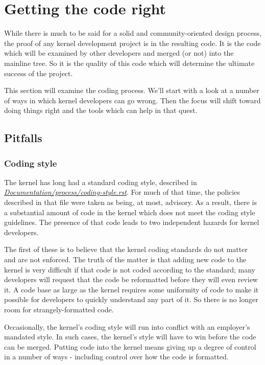 \documentclass[a4paper,8pt,english]{sphinxmanual}
\begin{document}
\section{Getting the code right}
\label{process/4.Coding:development-coding}\label{process/4.Coding:getting-the-code-right}\label{process/4.Coding::doc}
While there is much to be said for a solid and community-oriented design
process, the proof of any kernel development project is in the resulting
code.  It is the code which will be examined by other developers and merged
(or not) into the mainline tree.  So it is the quality of this code which
will determine the ultimate success of the project.

This section will examine the coding process.  We'll start with a look at a
number of ways in which kernel developers can go wrong.  Then the focus
will shift toward doing things right and the tools which can help in that
quest.


\subsection{Pitfalls}
\label{process/4.Coding:pitfalls}

\subsubsection{Coding style}
\label{process/4.Coding:coding-style}
The kernel has long had a standard coding style, described in
{\hyperref[process/coding\string-style:codingstyle]{\emph{Documentation/process/coding-style.rst}}}.  For much of
that time, the policies described in that file were taken as being, at most,
advisory.  As a result, there is a substantial amount of code in the kernel
which does not meet the coding style guidelines.  The presence of that code
leads to two independent hazards for kernel developers.

The first of these is to believe that the kernel coding standards do not
matter and are not enforced.  The truth of the matter is that adding new
code to the kernel is very difficult if that code is not coded according to
the standard; many developers will request that the code be reformatted
before they will even review it.  A code base as large as the kernel
requires some uniformity of code to make it possible for developers to
quickly understand any part of it.  So there is no longer room for
strangely-formatted code.

Occasionally, the kernel's coding style will run into conflict with an
employer's mandated style.  In such cases, the kernel's style will have to
win before the code can be merged.  Putting code into the kernel means
giving up a degree of control in a number of ways - including control over
how the code is formatted.
\end{document}
